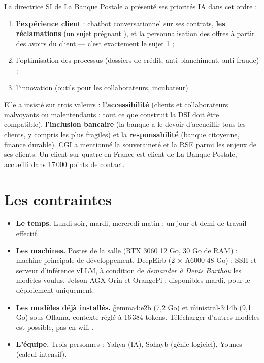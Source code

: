 La directrice SI de La Banque Postale a présenté ses priorités IA dans cet ordre :
\begin{enumerate}
  \item \textbf{l'expérience client} : chatbot conversationnel sur ses contrats, \textbf{les
        réclamations} (\og un sujet prégnant \fg), et la personnalisation des offres à partir des
        avoirs du client --- c'est exactement le sujet 1 ;
  \item l'optimisation des processus (dossiers de crédit, anti-blanchiment, anti-fraude) ;
  \item l'innovation (outils pour les collaborateurs, incubateur).
\end{enumerate}
Elle a insisté sur trois valeurs : \textbf{l'accessibilité} (clients et collaborateurs malvoyants
ou malentendants : tout ce que construit la DSI doit être compatible), \textbf{l'inclusion
bancaire} (la banque a le devoir d'accueillir tous les clients, y compris les plus fragiles) et la
\textbf{responsabilité} (banque citoyenne, finance durable). CGI a mentionné la souveraineté et
la RSE parmi les enjeux de ses clients. Un client sur quatre en France est client de La Banque
Postale, accueilli dans 17\,000 points de contact.

\section{Les contraintes}

\begin{itemize}
  \item \textbf{Le temps.} Lundi soir, mardi, mercredi matin : un jour et demi de travail effectif.
  \item \textbf{Les machines.} Postes de la salle (RTX 3060 12 Go, 30 Go de RAM) : machine
        principale de développement. DeepEirb (2 $\times$ A6000 48 Go) : SSH et serveur
        d'inférence vLLM, à condition de \emph{demander à Denis Barthou} les modèles voulus.
        Jetson AGX Orin et OrangePi : disponibles mardi, pour le déploiement uniquement.
  \item \textbf{Les modèles déjà installés.} \f{gemma4:e2b} (7,2 Go) et \f{ministral-3:14b}
        (9,1 Go) sous Ollama, contexte réglé à 16\,384 tokens. Télécharger d'autres modèles est
        possible, \og pas en wifi \fg.
  \item \textbf{L'équipe.} Trois personnes : Yahya (IA), Sohayb (génie logiciel), Younes (calcul
        intensif).
\end{itemize}

